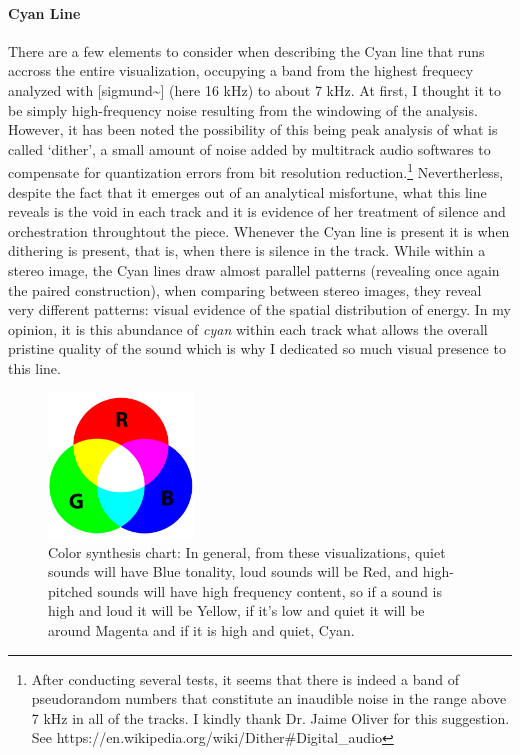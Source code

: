\documentclass{article}
\begin{document}
\paragraph{Cyan Line}
There are a few elements to consider when describing the Cyan line that runs accross the entire visualization, occupying a band from the highest frequecy analyzed with [sigmund\~{}] (here 16 kHz) to about 7 kHz. At first, I thought it to be simply high-frequency noise resulting from the windowing of the analysis. However, it has been noted the possibility of this being peak analysis of what is called `dither', a small amount of noise added by multitrack audio softwares to compensate for quantization errors from bit resolution reduction.\footnote{ After conducting several tests, it seems that there is indeed a band of pseudorandom numbers that constitute an inaudible noise in the range above 7 kHz in all of the tracks. I kindly thank Dr. Jaime Oliver for this suggestion. See https://en.wikipedia.org/wiki/Dither\#Digital\_audio} Nevertherless, despite the fact that it emerges out of an analytical misfortune, what this line reveals is the void in each track and it is evidence of her treatment of silence and orchestration throughtout the piece. Whenever the Cyan line is present it is when dithering is present, that is, when there is silence in the track. While within a stereo image, the Cyan lines draw almost parallel patterns (revealing once again the paired construction), when comparing between stereo images, they reveal very different patterns: visual evidence of the spatial distribution of energy. In my opinion, it is this abundance of \emph{cyan} within each track what allows the overall pristine quality of the sound which is why I dedicated so much visual presence to this line. 
\begin{figure}
\begin{center}
\includegraphics[width=1.5161in,height=1.5161in]{foryoungears-img004.png}
 \caption{Color synthesis chart: In general, from these visualizations, quiet sounds will have Blue tonality, loud sounds will be Red, and high-pitched sounds will have high frequency content, so if a sound is high and loud it will be Yellow, if it's low and quiet it will be around Magenta and if it is high and quiet, Cyan.}
\end{center}
\end{figure}
\end{document}
